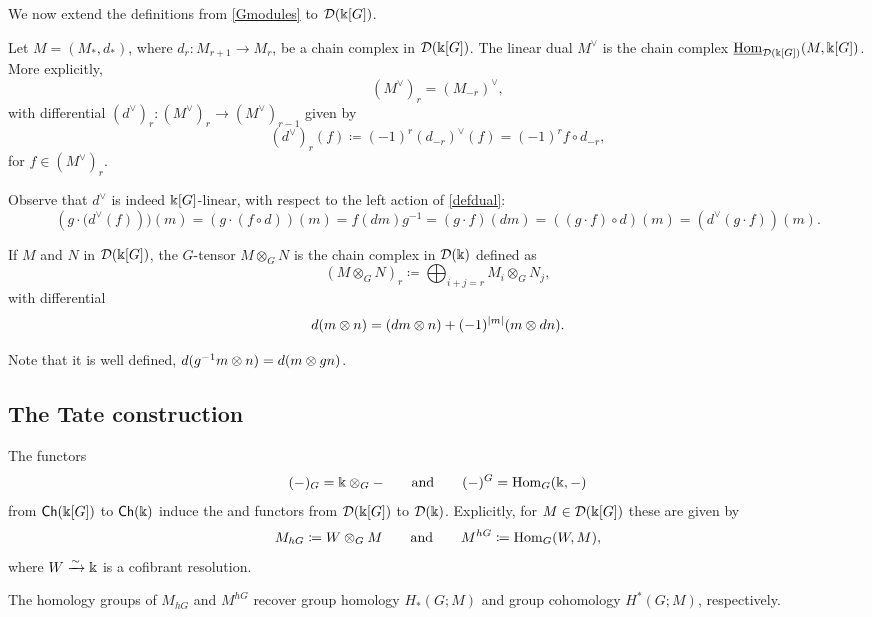 We now extend the definitions from \cref{Gmodules} to \(\mathcal{D}(\Bbbk[G])\).

\begin{definition}	
	Let \(M = (M_*,d_*)\), where \(d_r \colon M_{r+1} \to M_r\), be a chain complex in \(\mathcal{D}(\Bbbk[G])\). The linear dual \(M^\vee\) is the chain complex \(\underline{\mathrm{Hom}}_{\mathcal{D}(\Bbbk[G])}(M, \Bbbk[G])\).
	More explicitly, 
	\[
	(M^\vee)_r = (M_{-r})^\vee,
	\]
	with differential \((d^\vee)_r \colon (M^\vee)_r \to (M^\vee)_{r-1}\) given by
	\[
	(d^\vee)_r (f) \coloneqq (-1)^r (d_{-r})^\vee (f) = (-1)^r f \circ d_{-r},
	\]
	for \(f \in (M^\vee)_r\).
\end{definition}
Observe that \(d^\vee\) is indeed \(\Bbbk[G]\)-linear, with respect to the left action of \cref{defdual}:
\[
\left (g \cdot (d^\vee(f)\right ))(m) = \left (g \cdot (f \circ d)\right )(m) = f(dm)g^{-1} = (g\cdot f)(dm) = \left ((g \cdot f) \circ d\right )(m) = \left (d^\vee(g \cdot f)\right )(m).
\]
\begin{definition}
	If \(M\) and \(N\) in \(\mathcal{D}(\Bbbk[G])\), the \(G\)-tensor \(M \otimes_G N\) is the chain complex in \(\mathcal{D}(\Bbbk)\) defined as
	\[
	(M \otimes_G N)_r \coloneqq \bigoplus_{i+j=r} M_i \otimes_G N_j,
	\]
	with differential
	\[
	d(m \otimes n) = (d m \otimes n) + (-1)^{|m|} (m \otimes dn).
	\]
\end{definition}
Note that it is well defined, \(d(g^{-1}m \otimes n) = d(m \otimes gn)\).


\subsection{The Tate construction}

\begin{definition}
	The functors
	\[
	(-)_G = \Bbbk \otimes_G - \qquad\text{and}\qquad (-)^G = \mathrm{Hom}_G(\Bbbk,-)
	\]
	from \(\mathsf{Ch}(\Bbbk[G])\) to \(\mathsf{Ch}(\Bbbk)\) induce the  and  functors from \(\mathcal D(\Bbbk[G])\) to \(\mathcal D(\Bbbk)\).
	Explicitly, for \(M \in \mathcal D(\Bbbk[G])\) these are given by
	\[
	M_{hG} \coloneqq W \otimes_G M \qquad\text{and}\qquad M^{hG} \coloneqq \mathrm{Hom}_G(W,M),
	\]
	where \(W \xrightarrow{\sim} \Bbbk\) is a cofibrant resolution.
\end{definition}

The homology groups of \(M_{hG}\) and \(M^{hG}\) recover group homology \(H_*(G;M)\) and group cohomology \(H^*(G;M)\), respectively.

